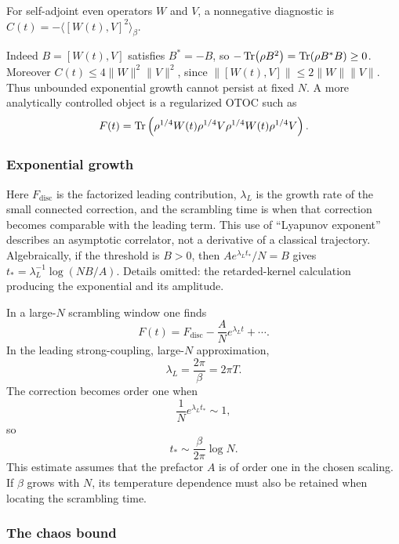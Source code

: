\documentclass[11pt]{article}
\numberwithin{equation}{section}
\theoremstyle{exposition}
\theoremstyle{result}
\begin{document}
For self-adjoint even operators $W$ and $V$, a nonnegative diagnostic is $C(t)=-\langle[W(t),V]^2\rangle_\beta$.


Indeed $B=[W(t),V]$ satisfies $B^*=-B$, so $-\Tr(\rho B^2)=\Tr(\rho B^*B)\geq0$. Moreover $C(t)\leq4\|W\|^2\|V\|^2$, since $\|[W(t),V]\|\leq2\|W\|\|V\|$. Thus unbounded exponential growth cannot persist at fixed $N$. A more analytically controlled object is a regularized OTOC such as
\begin{equation*}
F(t)=\Tr\left(
\rho^{1/4}W(t)\rho^{1/4}V
\rho^{1/4}W(t)\rho^{1/4}V
\right).
\end{equation*}

\subsubsection{Exponential growth}


Here $F_{\mathrm{disc}}$ is the factorized leading contribution, $\lambda_L$ is the growth rate of the small connected correction, and the scrambling time is when that correction becomes comparable with the leading term. This use of ``Lyapunov exponent'' describes an asymptotic correlator, not a derivative of a classical trajectory. Algebraically, if the threshold is $B>0$, then $Ae^{\lambda_Lt_*}/N=B$ gives $t_*=\lambda_L^{-1}\log(NB/A)$. Details omitted: the retarded-kernel calculation producing the exponential and its amplitude.

In a large-$N$ scrambling window one finds
\begin{equation}
F(t)=F_{\mathrm{disc}}-\frac{A}{N}e^{\lambda_L t}+\cdots.
\label{eq:OTOCgrowth}
\end{equation}
In the leading strong-coupling, large-$N$ approximation,
\begin{equation}
\lambda_L=\frac{2\pi}{\beta}=2\pi T.
\label{eq:maxchaos}
\end{equation}
The correction becomes order one when
\begin{equation*}
\frac1N e^{\lambda_L t_*}\sim1,
\end{equation*}
so
\begin{equation*}
t_*\sim \frac{\beta}{2\pi}\log N.
\end{equation*}
This estimate assumes that the prefactor $A$ is of order one in the chosen scaling. If $\beta$ grows with $N$, its temperature dependence must also be retained when locating the scrambling time.

\subsubsection{The chaos bound}
\end{document}

